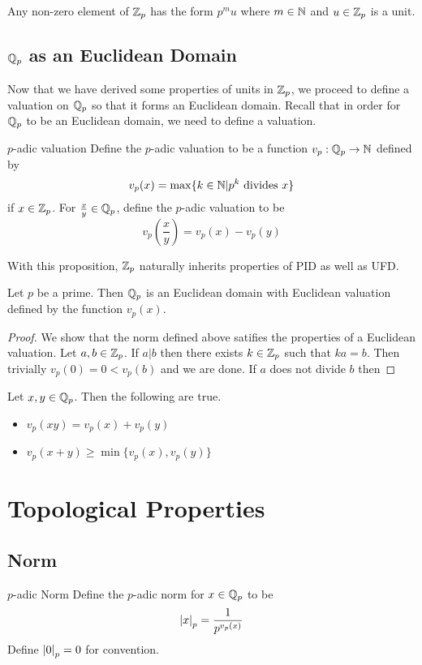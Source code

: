 \documentclass[a4paper]{article}
\begin{document}
\begin{crl}{}{} Any non-zero element of $\mathbb{Z}_p$ has the form $p^mu$ where $m\in\mathbb{N}$ and $u\in\mathbb{Z}_p$ is a unit. 
\end{crl}

\subsection{$\mathbb{Q}_p$ as an Euclidean Domain}
Now that we have derived some properties of units in $\mathbb{Z}_p$, we proceed to define a valuation on $\mathbb{Q}_p$ so that it forms an Euclidean domain. Recall that in order for $\mathbb{Q}_p$ to be an Euclidean domain, we need to define a valuation. 

\begin{defn}{$p$-adic valuation}{} Define the $p$-adic valuation to be a function $v_p:\mathbb{Q}_p\to\mathbb{N}$ defined by $$v_p(x)=\max\{k\in\mathbb{N}|p^k\text{ divides }x\}$$ if $x\in\mathbb{Z}_p$. For $\frac{x}{y}\in\mathbb{Q}_p$, define the $p$-adic valuation to be $$v_p\left(\frac{x}{y}\right)=v_p(x)-v_p(y)$$
\end{defn}

With this proposition, $\mathbb{Z}_p$ naturally inherits properties of PID as well as UFD. 

\begin{prp}{}{} Let $p$ be a prime. Then $\mathbb{Q}_p$ is an Euclidean domain with Euclidean valuation defined by the function $v_p(x)$. \tcbline
\begin{proof}
We show that the norm defined above satifies the properties of a Euclidean valuation. Let $a,b\in\mathbb{Z}_p$. If $a|b$ then there exists $k\in\mathbb{Z}_p$ such that $ka=b$. Then trivially $v_p(0)=0<v_p(b)$ and we are done. If $a$ does not divide $b$ then 
\end{proof}
\end{prp}

\begin{prp}{}{} Let $x,y\in\mathbb{Q}_p$. Then the following are true. 
\begin{itemize}
\item $v_p(xy)=v_p(x)+v_p(y)$
\item $v_p(x+y)\geq\min\{v_p(x),v_p(y)\}$
\end{itemize}
\end{prp}

\pagebreak
\section{Topological Properties}
\subsection{Norm}
\begin{defn}{$p$-adic Norm}{} Define the $p$-adic norm for $x\in\mathbb{Q}_p$ to be $$\abs{x}_p=\frac{1}{p^{v_p(x)}}$$ Define $\abs{0}_p=0$ for convention. 
\end{defn}
\end{document}
